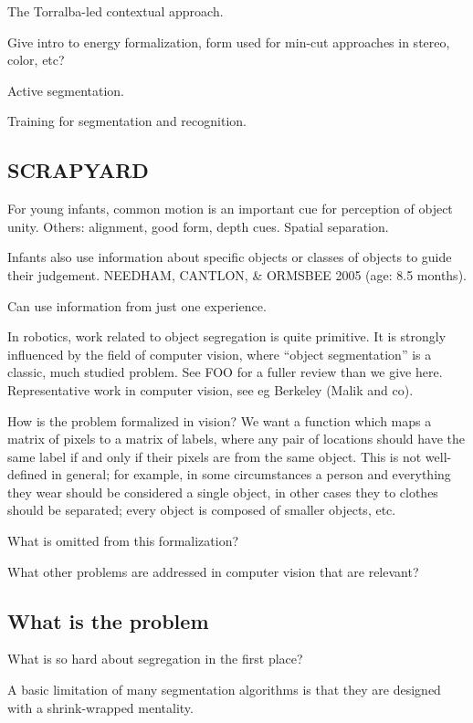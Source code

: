 The Torralba-led contextual approach.

Give intro to energy formalization, form used
for min-cut approaches in stereo, color, etc?

Active segmentation.

Training for segmentation and recognition.



\subsection{SCRAPYARD}

For young infants, common motion is an important cue for 
perception of object unity.  Others: alignment, good form,
depth cues.  Spatial separation.

Infants also use information about specific objects or
classes of objects to guide their judgement.  
NEEDHAM, CANTLON, \& ORMSBEE 2005 (age: 8.5 months).

Can use information from just one experience.



In robotics, work related to object segregation is quite
primitive.  It is strongly influenced by the field
of computer vision, where ``object segmentation'' is a classic,
much studied problem.  See FOO for a fuller review than we give
here.  Representative work in computer vision,
see eg Berkeley (Malik and co).

How is the problem formalized in vision?  We want a function
which maps a matrix of pixels to a matrix of labels, where
any pair of locations should have the same label if and
only if their pixels are from the same object.
This is not well-defined in general; for example, in some
circumstances a person and everything they wear should be
considered a single object, in other cases they to clothes
should be separated; every object is composed of smaller
objects, etc.

What is omitted from this formalization?

What other problems are addressed in computer vision that
are relevant?


\subsection{What is the problem}

What is so hard about segregation in the first place?

A basic limitation of many segmentation algorithms is
that they are designed with a shrink-wrapped mentality.


